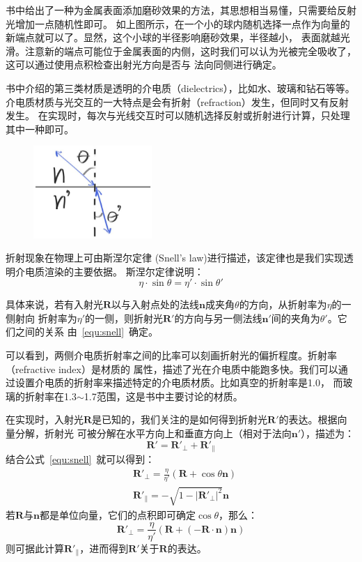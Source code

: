 \documentclass[12pt]{article}
\begin{document}
\indent{}书中给出了一种为金属表面添加磨砂效果的方法，其思想相当易懂，只需要给反射光增加一点随机性即可。
如上图所示，在一个小的球内随机选择一点作为向量的新端点就可以了。显然，这个小球的半径影响磨砂效果，半径越小，
表面就越光滑。注意新的端点可能位于金属表面的内侧，这时我们可以认为光被完全吸收了，这可以通过使用点积检查出射光方向是否与
法向同侧进行确定。

\indent{}书中介绍的第三类材质是透明的介电质（dielectrics），比如水、玻璃和钻石等等。
介电质材质与光交互的一大特点是会有折射（refraction）发生，但同时又有反射发生。
在实现时，每次与光线交互时可以随机选择反射或折射进行计算，只处理其中一种即可。
\begin{figure}[h]
\centering
\includegraphics[width=0.4\textwidth]{./imgs/fig-1.13-refraction.jpg}
\end{figure}

\indent{}折射现象在物理上可由斯涅尔定律 (Snell's law)进行描述，该定律也是我们实现透明介电质渲染的主要依据。
斯涅尔定律说明：
\begin{equation}
\label{equ:snell}
\eta \cdot \sin\theta = \eta' \cdot \sin\theta'
\end{equation}

\indent{}具体来说，若有入射光$\mathbf{R}$以与入射点处的法线$\mathbf{n}$成夹角$\theta$的方向，从折射率为$\eta$的一侧射向
折射率为$\eta'$的一侧，则折射光$\mathbf{R}'$的方向与另一侧法线$\mathbf{n}'$间的夹角为$\theta'$。它们之间的关系
由~\ref{equ:snell}~确定。

\indent{}可以看到，两侧介电质折射率之间的比率可以刻画折射光的偏折程度。折射率（refractive index）是材质的
属性，描述了光在介电质中能跑多快。我们可以通过设置介电质的折射率来描述特定的介电质材质。比如真空的折射率是1.0，
而玻璃的折射率在1.3$\sim$1.7范围，这是书中主要讨论的材质。

\indent{}在实现时，入射光$\mathbf{R}$是已知的，我们关注的是如何得到折射光$\mathbf{R}'$的表达。根据向量分解，折射光
可被分解在水平方向上和垂直方向上（相对于法向$\mathbf{n}'$），描述为：
\begin{equation}
\mathbf{R'} = \mathbf{R'}_{\bot} + \mathbf{R'}_{\parallel}
\end{equation}
结合公式~\ref{equ:snell}~就可以得到：
\begin{align*}
&\mathbf{R'}_{\bot} = \frac{\eta}{\eta'} (\mathbf{R} + \cos\theta \mathbf{n})\\
&\mathbf{R'}_{\parallel} = -\sqrt{1 - |\mathbf{R'}_{\bot}|^2} \mathbf{n}
\end{align*}
若$\mathbf{R}$与$\mathbf{n}$都是单位向量，它们的点积即可确定$\cos\theta$，那么：
\begin{equation}
\mathbf{R'}_{\bot} = \frac{\eta}{\eta'} (\mathbf{R} + (\mathbf{-R} \cdot \mathbf{n}) \mathbf{n})
\end{equation}
则可据此计算$\mathbf{R'}_{\parallel}$，进而得到$\mathbf{R}'$关于$\mathbf{R}$的表达。
\end{document}
